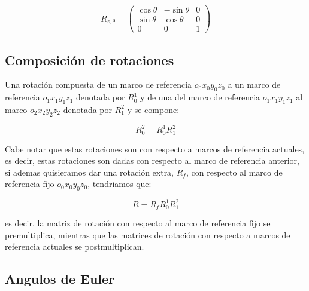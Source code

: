 \begin{multicols*}{3}
            \begin{equation}
                R_{z, \theta} =
                \begin{pmatrix}
                    \cos{\theta} & -\sin{\theta} & 0 \\
                    \sin{\theta} & \cos{\theta} & 0 \\
                    0 & 0 & 1
                \end{pmatrix}
            \end{equation}


        \subsection{Composición de rotaciones}

            Una rotación compuesta de un marco de referencia $o_0 x_0 y_0 z_0$ a un marco de referencia $o_1 x_1 y_1 z_1$ denotada por $R_0^1$ y de una del marco de referencia $o_1 x_1 y_1 z_1$ al marco $o_2 x_2 y_2 z_2$ denotada por $R_1^2$ y se compone:

            \begin{equation}
                R_0^2 = R_0^1 R_1^2
            \end{equation}

            Cabe notar que estas rotaciones son con respecto a marcos de referencia actuales, es decir, estas rotaciones son dadas con respecto al marco de referencia anterior, si ademas quisieramos dar una rotación extra, $R_f$, con respecto al marco de referencia fijo $o_0 x_0 y_0 z_0$, tendriamos que:

            \begin{equation}
                R = R_f R_0^1 R_1^2
            \end{equation}

            es decir, la matriz de rotación con respecto al marco de referencia fijo se premultiplica, mientras que las matrices de rotación con respecto a marcos de referencia actuales se postmultiplican.


        \subsection{Angulos de Euler}


\end{multicols*}
